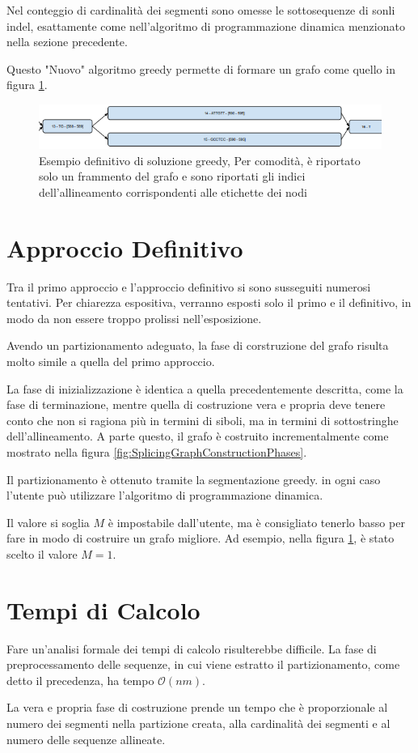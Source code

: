 Nel conteggio di cardinalità dei segmenti sono omesse le sottosequenze di sonli indel, esattamente come nell'algoritmo di programmazione dinamica menzionato nella sezione precedente.

Questo "Nuovo" algoritmo greedy permette di formare un grafo come quello in figura \ref{fig:greedy_definitivo}.

\begin{figure}
    \centering
    \includegraphics[scale=0.9]{images/greedy2.PNG}
    \caption{Esempio definitivo di soluzione greedy, Per comodità, è riportato solo un frammento del grafo e sono riportati gli indici dell'allineamento corrispondenti alle etichette dei nodi}
    \label{fig:greedy_definitivo}
\end{figure}

\section{Approccio Definitivo}
Tra il primo approccio e l'approccio definitivo si sono susseguiti numerosi tentativi. Per chiarezza espositiva, verranno esposti solo il primo e il definitivo, in modo da non essere troppo prolissi nell'esposizione.

Avendo un partizionamento adeguato, la fase di corstruzione del grafo risulta molto simile a quella del primo approccio. 

La fase di inizializzazione è identica a quella precedentemente descritta, come la fase di terminazione, mentre quella di costruzione vera e propria deve tenere conto che non si ragiona più in termini di siboli, ma in termini di sottostringhe dell'allineamento. A parte questo, il grafo è costruito incrementalmente come mostrato nella figura \ref{fig:SplicingGraphConstructionPhases}.

Il partizionamento è ottenuto tramite la segmentazione greedy. in ogni caso l'utente può utilizzare l'algoritmo di programmazione dinamica.

Il valore si soglia $M$ è impostabile dall'utente, ma è consigliato tenerlo basso per fare in modo di costruire un grafo migliore. Ad esempio, nella figura \ref{fig:greedy_definitivo}, è stato scelto il valore $M=1$.

\section{Tempi di Calcolo}
Fare un'analisi formale dei tempi di calcolo risulterebbe difficile. La fase di preprocessamento delle sequenze, in cui viene estratto il partizionamento, come detto il precedenza, ha tempo $\mathcal{O}(nm)$. 

La vera e propria fase di costruzione prende un tempo che è proporzionale al numero dei segmenti nella partizione creata, alla cardinalità dei segmenti e al numero delle sequenze allineate.




